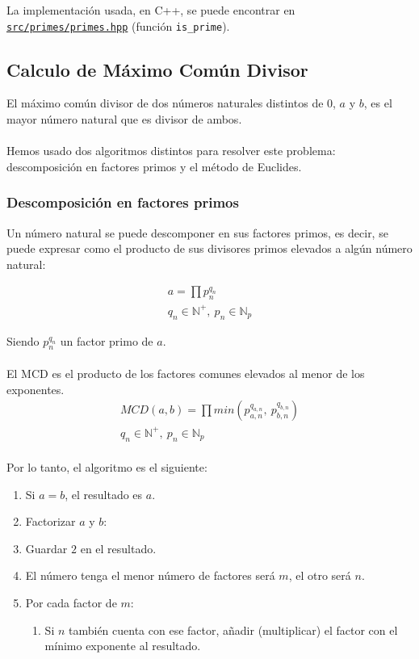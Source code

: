 La implementación usada, en C++, se puede encontrar en \href{run:./src/primes/primes.hpp}{\texttt{src/primes/primes.hpp}} (función \texttt{is\_prime}).


\subsection{Calculo de Máximo Común Divisor}

El máximo común divisor de dos números naturales distintos de $0$, $a$ y $b$, es el mayor número natural que es divisor de ambos.\\
\\
Hemos usado dos algoritmos distintos para resolver este problema: descomposición en factores primos y el método de Euclides.

\subsubsection{Descomposición en factores primos}

Un número natural se puede descomponer en sus factores primos, es decir, se puede expresar como el producto de sus divisores primos elevados a algún número natural:

\begin{gather*}
    a = \prod p_n^{q_n} \\ 
    q_n \in \mathbb{N}^+,\ p_n \in \mathbb{N}_p
\end{gather*}

Siendo $p_n^{q_n}$ un factor primo de $a$.\\
\\
El MCD es el producto de los factores comunes elevados al menor de los exponentes.
\begin{gather*}
    MCD(a, b) = \prod min(p_{a,n}^{q_{a,n}},\ p_{b,n}^{q_{b,n}}) \\ 
    q_n \in \mathbb{N}^+,\ p_n \in \mathbb{N}_p
\end{gather*}
\\
Por lo tanto, el algoritmo es el siguiente:
\begin{enumerate}
    \item Si $a=b$, el resultado es $a$.
    \item Factorizar $a$ y $b$:
    \item Guardar $2$ en el resultado.
    \item El número tenga el menor número de factores será $m$, el otro será $n$.
    \item Por cada factor de $m$:
    \begin{enumerate}
        \item Si $n$ también cuenta con ese factor, añadir (multiplicar) el factor con el mínimo exponente al resultado.
    \end{enumerate}
\end{enumerate}

